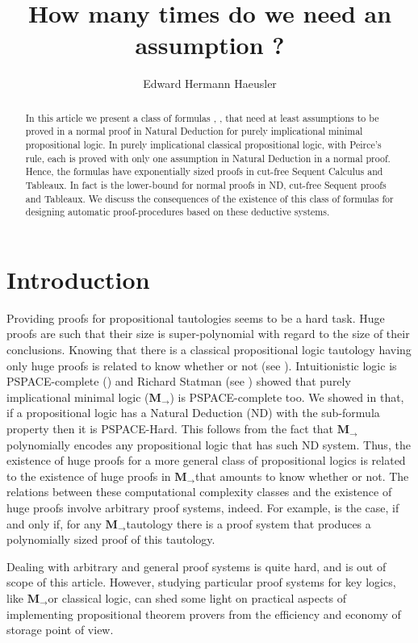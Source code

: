 \documentclass[11pt]{llncs}
\title{How many times do we need an assumption ?}
\author{Edward Hermann Haeusler}
\institute{Dep. Inform\'atica \\ PUC-Rio \\ \texttt{hermann@inf.puc-rio.br}}
\date{}
\newcommand{\mil}{\ensuremath{\mathbf{M}_{\rightarrow}}}
\begin{document}
\maketitle

\begin{abstract}
In this article we present a class of formulas , , that need at least  assumptions to be proved in a normal proof in Natural Deduction for purely implicational minimal propositional logic. In purely implicational classical propositional logic, with Peirce's rule, each  is proved with only one assumption in Natural Deduction in a normal proof. Hence, the formulas  have exponentially sized proofs in cut-free Sequent Calculus and  Tableaux. In fact  is the lower-bound for normal proofs in ND, cut-free Sequent proofs and Tableaux. We discuss the consequences of the existence of this class of formulas for designing automatic proof-procedures based on these deductive systems.  
\end{abstract} 



\section{Introduction}\label{intro}

Providing proofs for propositional tautologies seems to be a hard task.  Huge proofs are such that their size is  super-polynomial with regard to  the size of their conclusions.  Knowing that there is a classical propositional logic tautology having only huge proofs is related to know whether  or not (see \cite{Cook}). Intuitionistic logic is PSPACE-complete (\cite{Ladner}) and Richard Statman (see \cite{Statman}) showed that purely implicational minimal logic (\mil) is PSPACE-complete too. 
We showed in \cite{Haeusler} that, if a propositional logic has a Natural Deduction (ND) with the sub-formula property then it is PSPACE-Hard. This follows from the fact that \mil polynomially encodes any propositional logic that has such ND system.  Thus, 
the existence of huge proofs for a more general class of propositional logics is related to the existence of huge proofs in \mil that amounts to know whether  or not. The relations between these computational complexity classes and the existence of huge proofs involve arbitrary proof systems, indeed. For example,  is the case, if and only if, for any \mil tautology there is a proof system that produces a polynomially sized proof of this tautology. 

Dealing with arbitrary and general proof systems is quite hard, and is out of scope of this article. However, studying particular proof systems for key logics, like \mil or classical logic, can shed some light on practical aspects of implementing propositional theorem provers from the efficiency and economy of storage point of view.    
\end{document}
